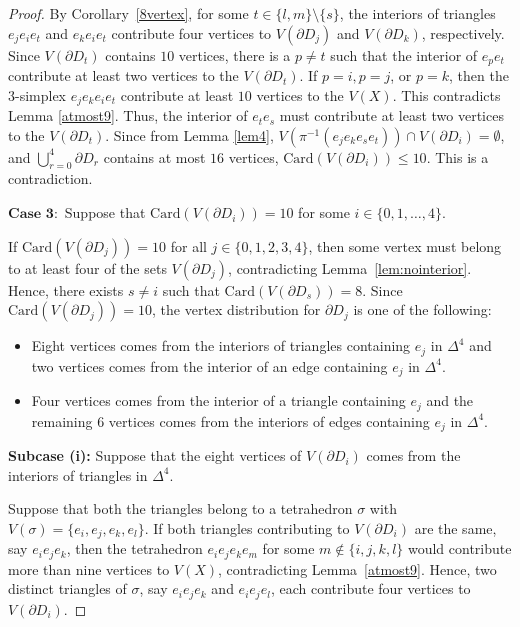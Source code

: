 \documentclass[10pt,a4paper]{amsart}
\newcommand{\D}{\Delta}
\begin{document}
\begin{proof}
By Corollary~\ref{8vertex}, for some $t \in \{l, m\} \setminus \{s\}$, the interiors of triangles $e_j e_i e_t$ and $e_k e_i e_t$ contribute four vertices to $V(\partial D_j)$ and $V(\partial D_k)$, respectively. Since $V(\partial D_t)$ contains $10$ vertices, there is a $p\neq t$ such that the interior of $e_pe_t$ contribute at least two vertices to the $V(\partial D_t)$. If $p=i,p=j$, or $p=k$, then the $3$-simplex $e_je_ke_ie_t$ contribute at least $10$ vertices to the $V(X)$. This contradicts Lemma \ref{atmost9}. Thus, the interior of $e_te_s$ must contribute at least two vertices to the $V(\partial D_t)$. Since from Lemma \ref{lem4}, $V(\pi^{-1}(e_je_ke_se_t))\cap V(\partial D_i)=\emptyset $, and $\bigcup_{r=0}^{4}\partial D_r$ contains at most $16$ vertices, $\mathrm{Card}(V(\partial D_i))\leq 10$. This is a contradiction.



$\textbf{Case 3}:$ Suppose that $\mathrm{Card}(V(\partial D_i)) = 10$ for some $i\in \{0,1,\ldots,4\}$. 

If $\mathrm{Card}(V(\partial D_j)) = 10$ for all $j \in \{0,1,2,3,4\}$, then some vertex must belong to at least four of the sets $V(\partial D_j)$, contradicting Lemma~\ref{lem:nointerior}. Hence, there exists $s \ne i$ such that $\mathrm{Card}(V(\partial D_s)) = 8$. Since $\mathrm{Card}(V(\partial D_j)) = 10$, the vertex distribution for $\partial D_j$ is one of the following:
\begin{itemize}
    \item [(i)] Eight vertices comes from the interiors of triangles containing $e_j$ in $\D^4$ and two vertices comes from the interior of an edge containing $e_j$ in $\D^4$.

    \item [(ii)] Four vertices comes from the interior of a triangle containing $e_j$ and the remaining $6$ vertices comes from the interiors of  edges containing $e_j$ in $\D^4$.
\end{itemize}

\textbf{Subcase (i):} Suppose that the  eight vertices of $V(\partial D_i)$ comes from the interiors of triangles in $\D^4$.  


Suppose that both the triangles belong to a tetrahedron $\sigma$ with $V(\sigma) = \{e_i, e_j, e_k, e_l\}$.  
If both triangles contributing to $V(\partial D_i)$ are the same, say $e_i e_j e_k$, then the  tetrahedron $e_i e_j e_k e_m$ for some $m \notin \{i,j,k,l\}$ would contribute more than nine vertices to $V(X)$, contradicting Lemma~\ref{atmost9}.  
Hence, two distinct triangles of $\sigma$, say $e_i e_j e_k$ and $e_i e_j e_l$, each contribute four vertices to $V(\partial D_i)$.


\end{proof}
\end{document}
